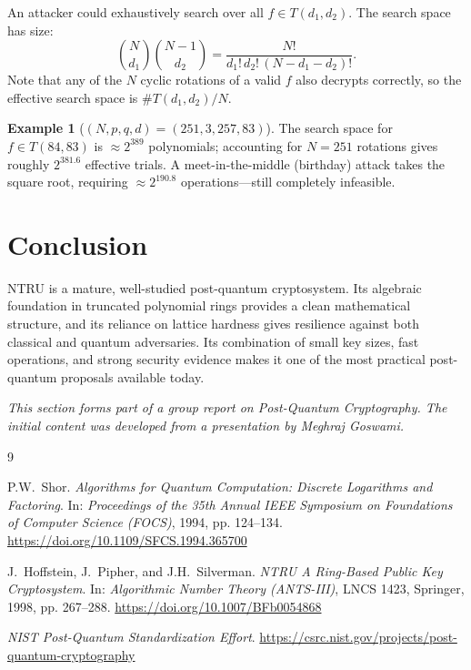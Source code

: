 \documentclass[12pt, a4paper]{article}
\theoremstyle{definition}
\newtheorem{example}{Example}[section]
\theoremstyle{plain}
\begin{document}
An attacker could exhaustively search over all $f \in T(d_1, d_2)$. The search
space has size:
\[
    \binom{N}{d_1}\binom{N-1}{d_2} = \dfrac{N!}{d_1!\, d_2!\, (N-d_1-d_2)!}.
\]
Note that any of the $N$ cyclic rotations of a valid $f$ also decrypts
correctly, so the effective search space is $\#T(d_1,d_2) / N$.

\begin{example}[$(N, p, q, d) = (251, 3, 257, 83)$]
    The search space for $f \in T(84, 83)$ is $\approx 2^{389}$
    polynomials; accounting for $N = 251$ rotations gives roughly $2^{381.6}$
    effective trials. A meet-in-the-middle (birthday) attack takes the square
    root, requiring $\approx 2^{190.8}$ operations---still completely infeasible.
\end{example}

\section{Conclusion}

NTRU is a mature, well-studied post-quantum cryptosystem. Its algebraic
foundation in truncated polynomial rings provides a clean mathematical
structure, and its reliance on lattice hardness gives resilience against both
classical and quantum adversaries. Its combination of small key sizes, fast
operations, and strong security evidence makes it one of the most practical
post-quantum proposals available today.

\bigskip
\noindent\textit{This section forms part of a group report on Post-Quantum
Cryptography. The initial content was developed from a presentation by
Meghraj Goswami.}

\begin{thebibliography}{9}

    P.W.~Shor. 
    \textit{Algorithms for Quantum Computation: Discrete Logarithms and Factoring}. 
    In: \textit{Proceedings of the 35th Annual IEEE Symposium on Foundations of Computer Science (FOCS)}, 1994, pp. 124--134. 
    \url{https://doi.org/10.1109/SFCS.1994.365700}

    J.~Hoffstein, J.~Pipher, and J.H.~Silverman. 
    \textit{NTRU\: A Ring-Based Public Key Cryptosystem}. 
    In: \textit{Algorithmic Number Theory (ANTS-III)}, LNCS 1423, Springer, 1998, pp. 267--288. 
    \url{https://doi.org/10.1007/BFb0054868}

    \textit{NIST Post-Quantum Standardization Effort}.
    \url{https://csrc.nist.gov/projects/post-quantum-cryptography}

\end{thebibliography}
\end{document}
